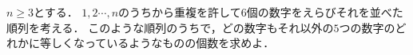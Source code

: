\documentclass[../../main.tex]{subfiles}
\begin{document}
$n\ge 3$とする．
$1,2 \cdots,n$のうちから重複を許して$6$個の数字をえらびそれを並べた順列を考える．
このような順列のうちで，どの数字もそれ以外の$5$つの数字のどれかに等しくなっているようなものの個数を求めよ．
\end{document}
